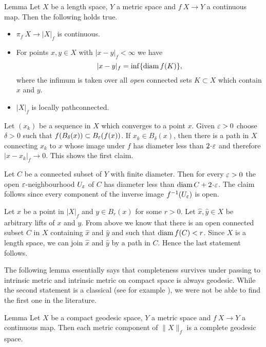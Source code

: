 \documentclass{article}
\begin{document}
\begin{thm}{Lemma}\label{lem:picont}
Let $X$ be a length space, $Y$ a metric space and $f\:X\to Y$ a continuous map. 
Then the following holds true.
\begin{itemize}
\item $\pi_f\:X\to|X|_f$ is continuous.

 \item For points $x,y\in X$ with $|x-y|_f<\infty$ we have
\[|x-y|_f=\inf\{\mathop{\rm diam}\nolimits f(K)\},\]
where the infimum is taken over all {\em open} connected sets $K\subset X$ which contain $x$ and $y$.

\item $|X|_f$ is locally pathconnected.
\end{itemize}

\end{thm}

Let $(x_k)$ be a sequence in $X$ which converges to a point $x$. 
Given $\varepsilon>0$ choose $\delta>0$ such that $f(B_\delta(x))\subset B_\varepsilon(f(x))$. 
If $x_k\in B_\delta(x)$, then there is a path in $X$ connecting $x_k$ to $x$ whose image under $f$ has diameter less than $2\cdot\eps$ and therefore $|x-x_k|_f\to 0$. 
This shows the first claim.

Let $C$ be a connected subset of $Y$ with finite diameter. 
Then for every $\varepsilon>0$ the open $\varepsilon$-neighbourhood $U_\varepsilon$ of $C$ has diameter less than $\diam C+2\cdot\eps$. 
The claim follows since every component of the inverse image $f^{-1}(U_\varepsilon)$ is open. 

Let $x$ be a point in $|X|_f$ and $y\in B_r(x)$ for some $r>0$. 
Let $\hat x,\hat y\in X$ be arbitrary lifts of $x$ and $y$.
From above we know that there is an open connected subset $C$ in $X$ containing $\hat x$ and $\hat y$ and such that 
$\mathop{\rm diam}\nolimits f(C)<r$. 
Since $X$ is a length space, we can join $\hat x$ and $\hat y$ by a path in $C$.
Hence the last statement follows.
\qeds

The following lemma essentially says that completeness survives under passing to intrinsic metric
and intrinsic metric on compact space is always geodesic.
While the second statement is a classical (see for example \cite[II-\S8 Thm. 3]{KF}), 
we were not be able to find the first one in the literature.

\begin{thm}{Lemma}\label{lem:geospace}
Let $X$ be a compact geodesic space, $Y$ a metric space and $f\:X\to Y$ a continuous map. 
Then each metric component of $\|X\|_f$ is a complete geodesic space.
\end{thm}
\end{document}
